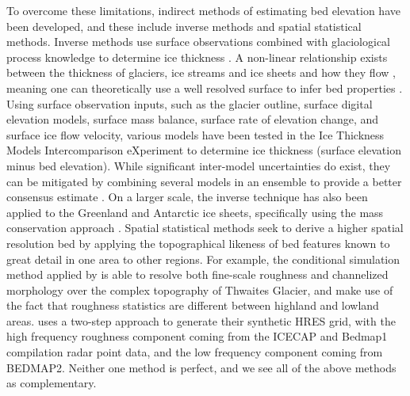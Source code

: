 \documentclass[tc, manuscript]{copernicus}
\begin{document}
To overcome these limitations, indirect methods of estimating bed elevation have been developed, and these include inverse methods and spatial statistical methods.
Inverse methods use surface observations combined with glaciological process knowledge to determine ice thickness \citep[e.g.][]{vanPeltiterativeinversemethod2013}.
A non-linear relationship exists between the thickness of glaciers, ice streams and ice sheets and how they flow \citep{Raymondrelationshipsurfacebasal2005}, meaning one can theoretically use a well resolved surface to infer bed properties \citep[e.g.][]{Farinottimethodestimateice2009}.
Using surface observation inputs, such as the glacier outline, surface digital elevation models, surface mass balance, surface rate of elevation change, and surface ice flow velocity, various models have been tested in the Ice Thickness Models Intercomparison eXperiment \citep[ITMIX,][]{FarinottiHowaccurateare2017} to determine ice thickness (surface elevation minus bed elevation).
While significant inter-model uncertainties do exist, they can be mitigated by combining several models in an ensemble to provide a better consensus estimate \citep{Farinotticonsensusestimateice2019}.
On a larger scale, the inverse technique has also been applied to the Greenland \citep{MorlighemBedMachinev3Complete2017} and Antarctic \citep{MorlighemDeepglacialtroughs2019} ice sheets, specifically using the mass conservation approach \citep{Morlighemmassconservationapproach2011}.
Spatial statistical methods seek to derive a higher spatial resolution bed by applying the topographical likeness of bed features known to great detail in one area to other regions.
For example, the conditional simulation method applied by \citet{GoffConditionalsimulationThwaites2014} is able to resolve both fine-scale roughness and channelized morphology over the complex topography of Thwaites Glacier, and make use of the fact that roughness statistics are different between highland and lowland areas.
\citet{Grahamhighresolutionsyntheticbed2017} uses a two-step approach to generate their synthetic HRES grid, with the high frequency roughness component coming from the ICECAP and Bedmap1 compilation radar point data, and the low frequency component coming from BEDMAP2.
Neither one method is perfect, and we see all of the above methods as complementary.
\end{document}
